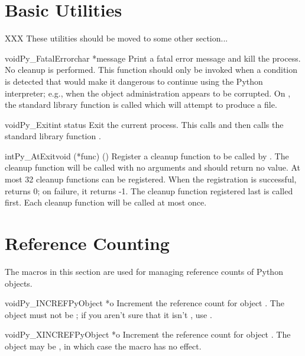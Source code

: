 \documentclass[twoside,openright]{report}
\begin{document}
\chapter{Basic Utilities}

XXX These utilities should be moved to some other section...

\begin{cfuncdesc}{void}{Py_FatalError}{char *message}
Print a fatal error message and kill the process.  No cleanup is
performed.  This function should only be invoked when a condition is
detected that would make it dangerous to continue using the Python
interpreter; e.g., when the object administration appears to be
corrupted.  On \UNIX{}, the standard \C{} library function  is 
called which will attempt to produce a  file.
\end{cfuncdesc}

\begin{cfuncdesc}{void}{Py_Exit}{int status}
Exit the current process.  This calls  and then
calls the standard \C{} library function .
\end{cfuncdesc}

\begin{cfuncdesc}{int}{Py_AtExit}{void (*func) ()}
Register a cleanup function to be called by .  The
cleanup function will be called with no arguments and should return no
value.  At most 32 cleanup functions can be registered.  When the
registration is successful,  returns 0; on failure, it
returns -1.  The cleanup function registered last is called first.
Each cleanup function will be called at most once.
\end{cfuncdesc}


\chapter{Reference Counting}

The macros in this section are used for managing reference counts
of Python objects.

\begin{cfuncdesc}{void}{Py_INCREF}{PyObject *o}
Increment the reference count for object .  The object must
not be \NULL{}; if you aren't sure that it isn't \NULL{}, use
.
\end{cfuncdesc}

\begin{cfuncdesc}{void}{Py_XINCREF}{PyObject *o}
Increment the reference count for object .  The object may be
\NULL{}, in which case the macro has no effect.
\end{cfuncdesc}
\end{document}
